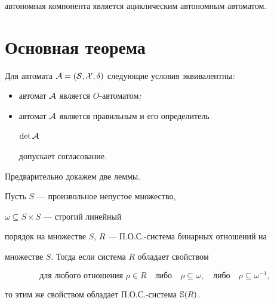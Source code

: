 автономная компонента является ациклическим автономным автоматом.





\section{Основная теорема}





\begin{thmnonum}


Для автомата $\cal A=(S,X,\delta)$ следующие условия эквивалентны{\em :}


\begin{itemize}


\item[1)] автомат $\cal A$ является $O$-автоматом{\em ;}


\item[2)] автомат $\cal A$ является правильным и его определитель


$\det\cal A$


допускает согласование.


\end{itemize}


\end{thmnonum}





Предварительно докажем две леммы.





\begin{lem}


Пусть $S$ --- произвольное непустое множество,


$\omega\subseteq S\times S$ --- строгий линейный


порядок на множестве $S$, $R$ --- П.О.С.-система бинарных отношений на


множестве $S$. Тогда если система $R$ обладает свойством


\begin{equation}


\text{для любого отношения } \rho\in R \quad \text{либо} \quad


\rho\subseteq\omega, \quad \text{либо}\quad \rho\subseteq\omega^{-1},


\tag{$\ast$}


\end{equation}


то этим же свойством обладает П.О.С.-система $\Bbb S(R)$.


\end{lem}






